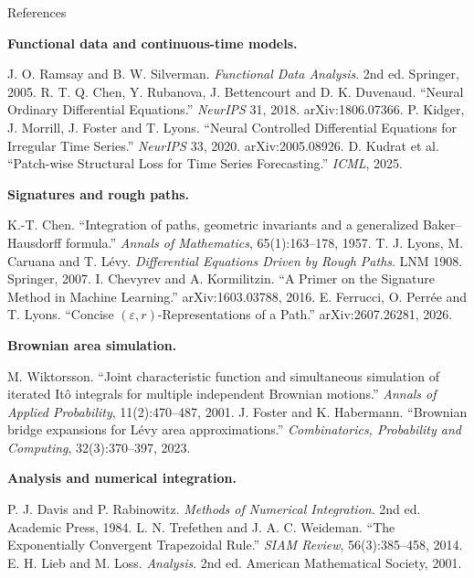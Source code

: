 \documentclass[aspectratio=169,9pt]{beamer}
\begin{document}
\begin{frame}{References}
  \fontsize{6.7}{8.0}\selectfont
  \setlength{\parskip}{0.45em}
  \raggedright

  \textbf{Functional data and continuous-time models.}\par
  J. O. Ramsay and B. W. Silverman. \emph{Functional Data Analysis}. 2nd ed. Springer, 2005.
  R. T. Q. Chen, Y. Rubanova, J. Bettencourt and D. K. Duvenaud. ``Neural Ordinary Differential Equations.'' \emph{NeurIPS} 31, 2018. arXiv:1806.07366.
  P. Kidger, J. Morrill, J. Foster and T. Lyons. ``Neural Controlled Differential Equations for Irregular Time Series.'' \emph{NeurIPS} 33, 2020. arXiv:2005.08926.
  D. Kudrat et al. ``Patch-wise Structural Loss for Time Series Forecasting.'' \emph{ICML}, 2025.

  \textbf{Signatures and rough paths.}\par
  K.-T. Chen. ``Integration of paths, geometric invariants and a generalized Baker--Hausdorff formula.'' \emph{Annals of Mathematics}, 65(1):163--178, 1957.
  T. J. Lyons, M. Caruana and T. L\'evy. \emph{Differential Equations Driven by Rough Paths}. LNM 1908. Springer, 2007.
  I. Chevyrev and A. Kormilitzin. ``A Primer on the Signature Method in Machine Learning.'' arXiv:1603.03788, 2016.
  E. Ferrucci, O. Perr\'ee and T. Lyons. ``Concise $(\varepsilon,r)$-Representations of a Path.'' arXiv:2607.26281, 2026.

  \textbf{Brownian area simulation.}\par
  M. Wiktorsson. ``Joint characteristic function and simultaneous simulation of iterated It\^o integrals for multiple independent Brownian motions.'' \emph{Annals of Applied Probability}, 11(2):470--487, 2001.
  J. Foster and K. Habermann. ``Brownian bridge expansions for L\'evy area approximations.'' \emph{Combinatorics, Probability and Computing}, 32(3):370--397, 2023.

  \textbf{Analysis and numerical integration.}\par
  P. J. Davis and P. Rabinowitz. \emph{Methods of Numerical Integration}. 2nd ed. Academic Press, 1984.
  L. N. Trefethen and J. A. C. Weideman. ``The Exponentially Convergent Trapezoidal Rule.'' \emph{SIAM Review}, 56(3):385--458, 2014.
  E. H. Lieb and M. Loss. \emph{Analysis}. 2nd ed. American Mathematical Society, 2001.
\end{frame}
\end{document}

